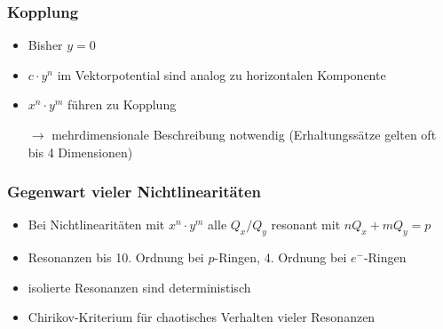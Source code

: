 \documentclass[hyperref={pdfpagelabels=false}]{beamer}
\begin{document}
\begin{frame}
 \frametitle{Kopplung}
 \pause
 \begin{itemize}
  \item Bisher $y=0$
  \item $c\cdot y^n$ im Vektorpotential sind analog zu horizontalen Komponente 
  \item $x^n\cdot y^m$ führen zu Kopplung
  \item[$\rightarrow$] mehrdimensionale Beschreibung notwendig (Erhaltungssätze gelten oft bis 4 Dimensionen)
 \end{itemize}

\end{frame}

\begin{frame}
 \frametitle{Gegenwart vieler Nichtlinearitäten}
 \begin{itemize}
  \item Bei Nichtlinearitäten mit $x^n\cdot y^m$ alle $Q_x/Q_y$ resonant mit $nQ_x + mQ_y = p$
  \item Resonanzen bis 10. Ordnung bei $p$-Ringen, 4. Ordnung bei $e^-$-Ringen
  \item isolierte Resonanzen sind deterministisch
  \item Chirikov-Kriterium für chaotisches Verhalten vieler Resonanzen
 \end{itemize}

 
\end{frame}
\end{document}
